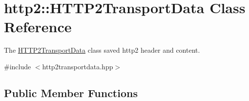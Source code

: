 \hypertarget{classhttp2_1_1HTTP2TransportData}{}\section{http2\+:\+:H\+T\+T\+P2\+Transport\+Data Class Reference}
\label{classhttp2_1_1HTTP2TransportData}


The \hyperlink{classhttp2_1_1HTTP2TransportData}{H\+T\+T\+P2\+Transport\+Data} class saved http2 header and content.  




{\ttfamily \#include $<$http2transportdata.\+hpp$>$}

\subsection*{Public Member Functions}
